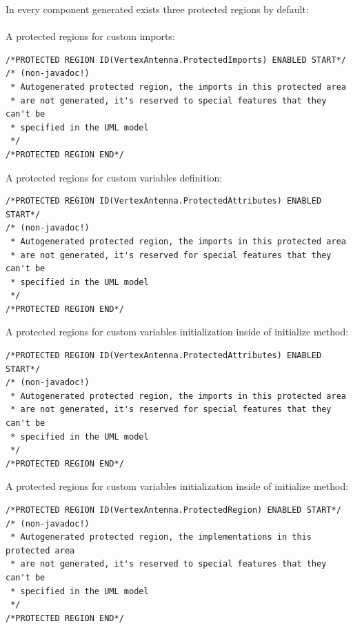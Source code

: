 In every component generated exists three protected regions by default:\\
\\
A protected regions for custom imports:
\begin{verbatim}
/*PROTECTED REGION ID(VertexAntenna.ProtectedImports) ENABLED START*/
/* (non-javadoc!)
 * Autogenerated protected region, the imports in this protected area
 * are not generated, it's reserved to special features that they can't be
 * specified in the UML model
 */
/*PROTECTED REGION END*/
\end{verbatim}

A protected regions for custom variables definition:
\begin{verbatim}
/*PROTECTED REGION ID(VertexAntenna.ProtectedAttributes) ENABLED START*/
/* (non-javadoc!)
 * Autogenerated protected region, the imports in this protected area
 * are not generated, it's reserved for special features that they can't be
 * specified in the UML model
 */
/*PROTECTED REGION END*/
\end{verbatim}

A protected regions for custom variables initialization inside of initialize
method:
\begin{verbatim}
/*PROTECTED REGION ID(VertexAntenna.ProtectedAttributes) ENABLED START*/
/* (non-javadoc!)
 * Autogenerated protected region, the imports in this protected area
 * are not generated, it's reserved for special features that they can't be
 * specified in the UML model
 */
/*PROTECTED REGION END*/
\end{verbatim}

A protected regions for custom variables initialization inside of initialize
method:
\begin{verbatim}
/*PROTECTED REGION ID(VertexAntenna.ProtectedRegion) ENABLED START*/
/* (non-javadoc!)
 * Autogenerated protected region, the implementations in this protected area
 * are not generated, it's reserved to special features that they can't be
 * specified in the UML model
 */
/*PROTECTED REGION END*/
\end{verbatim}




